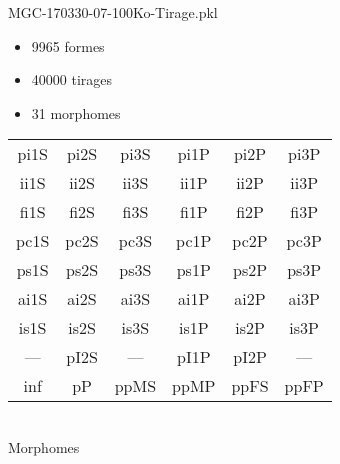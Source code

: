 MGC-170330-07-100Ko-Tirage.pkl
\begin{itemize}
\item 9965 formes
\item 40000 tirages
\item 31 morphomes
\end{itemize}
\begin{center}
\begin{tabular}{cccccc}
\hline
\cellcolor{white}pi1S & \cellcolor{orange}pi2S & \cellcolor{orange}pi3S & \cellcolor{white}pi1P & \cellcolor{white}pi2P & \cellcolor{white}pi3P\\
\cellcolor{brown}ii1S & \cellcolor{brown}ii2S & \cellcolor{brown}ii3S & \cellcolor{white}ii1P & \cellcolor{white}ii2P & \cellcolor{brown}ii3P\\
\cellcolor{yellow}fi1S & \cellcolor{lime}fi2S & \cellcolor{lime}fi3S & \cellcolor{green}fi1P & \cellcolor{white}fi2P & \cellcolor{green}fi3P\\
\cellcolor{yellow}pc1S & \cellcolor{yellow}pc2S & \cellcolor{yellow}pc3S & \cellcolor{white}pc1P & \cellcolor{white}pc2P & \cellcolor{yellow}pc3P\\
\cellcolor{teal}ps1S & \cellcolor{white}ps2S & \cellcolor{teal}ps3S & \cellcolor{white}ps1P & \cellcolor{white}ps2P & \cellcolor{teal}ps3P\\
\cellcolor{white}ai1S & \cellcolor{lightgray}ai2S & \cellcolor{lightgray}ai3S & \cellcolor{pink}ai1P & \cellcolor{pink}ai2P & \cellcolor{white}ai3P\\
\cellcolor{black}is1S & \cellcolor{pink}is2S & \cellcolor{lightgray}is3S & \cellcolor{black}is1P & \cellcolor{black}is2P & \cellcolor{pink}is3P\\
--- & \cellcolor{white}pI2S & --- & \cellcolor{white}pI1P & \cellcolor{white}pI2P & ---\\
\cellcolor{white}inf & \cellcolor{white}pP & \cellcolor{white}ppMS & \cellcolor{white}ppMP & \cellcolor{white}ppFS & \cellcolor{white}ppFP\\
\hline
\end{tabular}\\
Morphomes
\end{center}
\bigskip

